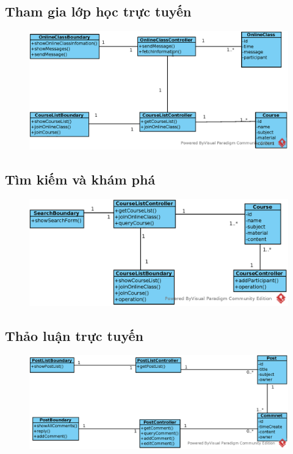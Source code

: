 \documentclass[./../main_file.tex]{subfiles}
\begin{document}
	\subsection{Tham gia lớp học trực tuyến}
	\begin{figure}[H]
		\centering
		\includegraphics[width=\linewidth]{./images/VOPCs/3_4_join_online_class.eps}
	\end{figure}
	
	\subsection{Tìm kiếm và khám phá}
	\begin{figure}[H]
		\centering
		\includegraphics[width=\linewidth]{./images/VOPCs/3_5_search_course.eps}
	\end{figure}
	
	\subsection{Thảo luận trực tuyến}
	\begin{figure}[H]
		\centering
		\includegraphics[width=\linewidth]{./images/VOPCs/3_6_forum_discussion.eps}
	\end{figure}
	
\end{document}
